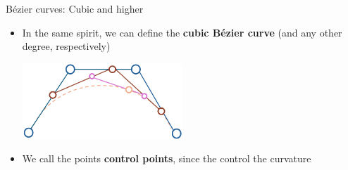\begin{frame}{B\'ezier curves: Cubic and higher}
    \begin{itemize}
        \item In the same spirit, we can define the \textbf{cubic B\'ezier curve} (and any other degree, respectively)
        \vspace{1em}
        \begin{center}
            \includegraphics[width=6cm]{contents/images/cubic_bezier}
        \end{center} \vspace{0.8em}
        \item We call the points \textbf{control points}, since the control the curvature
    \end{itemize}
\end{frame}

